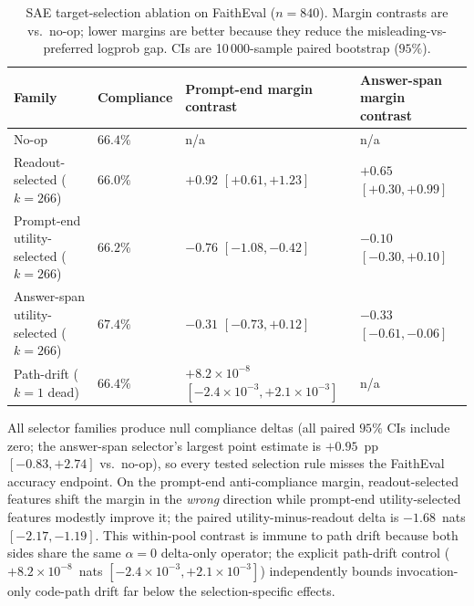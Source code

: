 \documentclass{article}
\begin{document}
\begin{table}[H]
\centering
\caption{SAE target-selection ablation on FaithEval ($n = 840$). Margin contrasts are vs.\ no-op; lower margins are better because they reduce the misleading-vs-preferred logprob gap. CIs are 10\,000-sample paired bootstrap ($95\%$).}
\label{tab:sae_selector}
\vskip 0.1in
\footnotesize
\begin{tabular}{@{}L{4.3cm}L{2.1cm}L{4.2cm}L{4.2cm}@{}}
\toprule
\textbf{Family} & \textbf{Compliance} & \textbf{Prompt-end margin contrast} & \textbf{Answer-span margin contrast} \\
\midrule
No-op                     & $66.4\%$              & n/a & n/a \\
Readout-selected ($k{=}266$) & $66.0\%$           & $+0.92$ $[+0.61, +1.23]$ & $+0.65$ $[+0.30, +0.99]$ \\
Prompt-end utility-selected ($k{=}266$) & $66.2\%$ & $-0.76$ $[-1.08, -0.42]$ & $-0.10$ $[-0.30, +0.10]$ \\
Answer-span utility-selected ($k{=}266$) & $67.4\%$ & $-0.31$ $[-0.73, +0.12]$ & $-0.33$ $[-0.61, -0.06]$ \\
Path-drift ($k{=}1$ dead)  & $66.4\%$             & $+8.2{\times}10^{-8}$ $[-2.4{\times}10^{-3}, +2.1{\times}10^{-3}]$ & n/a \\
\bottomrule
\end{tabular}
\vskip -0.1in
\end{table}

All selector families produce null compliance deltas (all paired $95\%$ CIs include zero; the answer-span selector's largest point estimate is $+0.95$~pp $[-0.83, +2.74]$ vs.\ no-op), so every tested selection rule misses the FaithEval accuracy endpoint.
On the prompt-end anti-compliance margin, readout-selected features shift the margin in the \emph{wrong} direction while prompt-end utility-selected features modestly improve it; the paired utility-minus-readout delta is $-1.68$~nats $[-2.17, -1.19]$.
This within-pool contrast is immune to path drift because both sides share the same $\alpha = 0$ delta-only operator; the explicit path-drift control ($+8.2\times 10^{-8}$~nats $[-2.4\times10^{-3}, +2.1\times10^{-3}]$) independently bounds invocation-only code-path drift far below the selection-specific effects.
\end{document}
